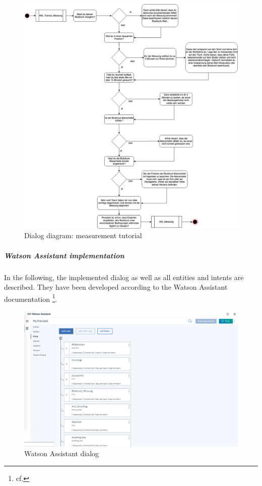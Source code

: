 \begin{figure}[h]
	\centering
	\includegraphics[width=1\textwidth]{images/06_tutorial_messung.png}
	\caption{Dialog diagram: measurement tutorial}
	\label{dialog_diagram_04}
\end{figure}


\subparagraph{Watson Assistant implementation}

In the following, the implemented dialog as well as all entities and intents are described. They have been developed according to the Watson Assistant documentation \footnote{cf.\autocite{wa_docu}}.

\begin{figure}[h]
	\centering
	\includegraphics[width=1\textwidth]{images/WA_dialog.png}
	\caption{Watson Assistant dialog}
	\label{wa_dialog}
\end{figure}


